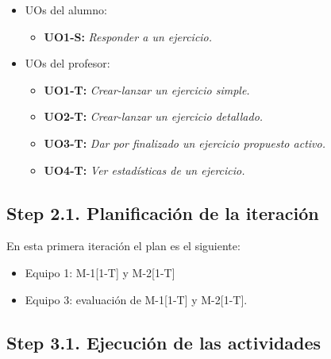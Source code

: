 \begin{itemize}
\item UOs del alumno:
	\begin{itemize}
	\item \textbf{UO1-S:} \textit{Responder a un ejercicio.}
	\end{itemize}
\item UOs del profesor:
	\begin{itemize}
	\item \textbf{UO1-T:} \textit{Crear-lanzar un ejercicio simple.}
	\item \textbf{UO2-T:} \textit{Crear-lanzar un ejercicio detallado.}
	\item \textbf{UO3-T:} \textit{Dar por finalizado un ejercicio propuesto activo.}
	\item \textbf{UO4-T:} \textit{Ver estadísticas de un ejercicio.}
	\end{itemize}
\end{itemize}

\subsection{Step 2.1. Planificación de la iteración}
\label{it1:2.1}

En esta primera iteración el plan es el siguiente:

\begin{itemize}
\item Equipo 1: M-1[1-T] y M-2[1-T]
\item Equipo 3: evaluación de M-1[1-T] y M-2[1-T].
\end{itemize}

\subsection{Step 3.1. Ejecución de las actividades}
\label{it1:3.1}

